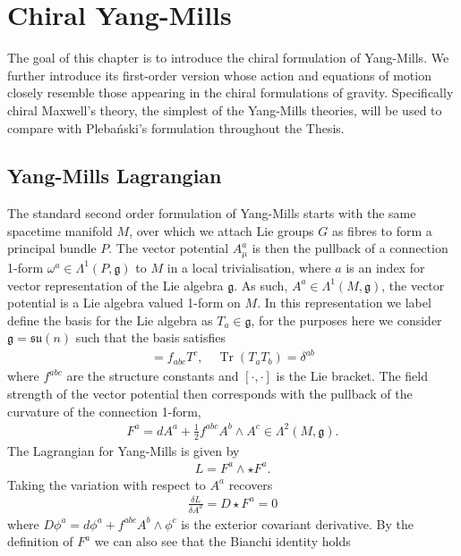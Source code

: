 \documentclass[10pt]{report}
\newcommand{\pleb}[0]{Pleba\'nski}
\theoremstyle{definition}
\DeclareMathOperator{\Tr}{Tr}
\begin{document}
    \newpage
\chapter{Chiral Yang-Mills}\label{chap:chiral-yang-mills}
The goal of this chapter is to introduce the chiral formulation of Yang-Mills. We further introduce its first-order version whose action and equations of motion closely resemble those appearing in the chiral formulations of gravity. Specifically chiral Maxwell's theory, the simplest of the Yang-Mills theories, will be used to compare with \pleb{}'s formulation throughout the Thesis.

\section{Yang-Mills Lagrangian}
The standard second order formulation of Yang-Mills starts with the same spacetime manifold $M$, over which we attach Lie groups $G$ as fibres to form a principal bundle $P$. The vector potential $A^a_\mu$ is then the pullback of a connection 1-form $\omega^a \in \Lambda^1(P,\mathfrak{g})$ to $M$ in a local trivialisation, where $a$ is an index for vector representation of the Lie algebra $\mathfrak{g}$. As such, $A^a \in \Lambda^1(M,\mathfrak{g})$, the vector potential is a Lie algebra valued 1-form on $M$. In this representation we label define the basis for the Lie algebra as $T_a \in \mathfrak{g}$, for the purposes here we consider $\mathfrak{g} = \mathfrak{su}(n)$ such that the basis satisfies
\begin{align}
    [T_a,T_b] = f_{abc} T^c, \quad \Tr(T_a T_b) = \delta^{ab}
\end{align}
where $f^{abc}$ are the structure constants and $[ \cdot, \cdot ]$ is the Lie bracket. The field strength of the vector potential then corresponds with the pullback of the curvature of the connection 1-form,
\begin{align}
    F^a = d A^a + \frac{1}{2} f^{abc} A^b \wedge A^c \in \Lambda^2(M,\mathfrak{g}).
\end{align}
The Lagrangian for Yang-Mills is given by 
\begin{align}
    L = F^a \wedge \star F^a.
\end{align}
Taking the variation with respect to $A^a$ recovers 
\begin{align}
    \frac{\delta L}{\delta A^a} = D \star F^a = 0
\end{align}
where $D \phi^a = d \phi^a + f^{abc} A^b \wedge \phi^c$ is the exterior covariant derivative. By the definition of $F^a$ we can also see that the Bianchi identity holds 
\end{document}
